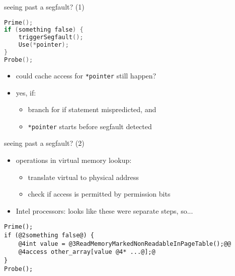 \begin{frame}[fragile]{seeing past a segfault? (1)}
\begin{lstlisting}[language=C,style=small]
Prime();
if (something false) {
    triggerSegfault();
    Use(*pointer);
}
Probe();
\end{lstlisting}
\begin{itemize}
\item could cache access for \texttt{*pointer} still happen?
\item yes, if:
    \begin{itemize}
    \item branch for if statement mispredicted, and
    \item \texttt{*pointer} starts before segfault detected
    \end{itemize}
\end{itemize}
\end{frame}

\begin{frame}[fragile]{seeing past a segfault? (2)}
\begin{itemize}
\item operations in virtual memory lookup:
    \begin{itemize}
    \item translate virtual to physical address
    \item check if access is permitted by permission bits
    \end{itemize}
\item Intel processors: looks like these were separate steps, so...
\end{itemize}
\begin{lstlisting}
Prime();
if (@2something false@) {
    @4int value = @3ReadMemoryMarkedNonReadableInPageTable();@@
    @4access other_array[value @4* ...@];@
}
Probe();
\end{lstlisting}
\end{frame}
